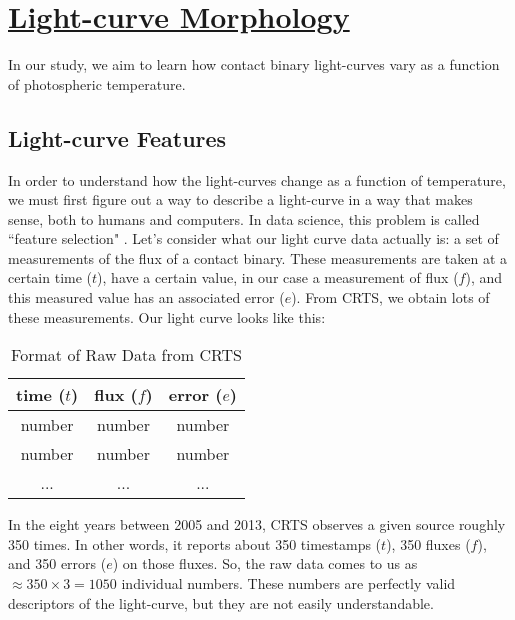 \documentclass[12pt]{article} %
\numberwithin{equation}{section} %
\begin{document}
\section[Light-curve Morphology]{\hyperlink{toc}{Light-curve Morphology}} \label{sec: lc_morph}

In our study, we aim to learn how contact binary light-curves vary as a function of photospheric temperature.

\subsection[Light-curve Features]{Light-curve Features} \label{sec: Light-curve Features}

In order to understand how the light-curves change as a function of temperature, we must first figure out a way to describe a light-curve in a way that makes sense, both to humans and computers. In data science, this problem is called ``feature selection" . Let's consider what our light curve data actually is: a set of measurements of the flux of a contact binary. These measurements are taken at a certain time ($t$), have a certain value, in our case a measurement of flux ($f$), and this measured value has an associated error ($e$). From CRTS, we obtain lots of these measurements. Our light curve looks like this:

\begin{table}[htdp]
\caption{Format of Raw Data from CRTS}
\begin{center}
\begin{tabular}{|c|c|c|} \hline
\textbf{time} ($t$) & \textbf{flux} ($f$) & \textbf{error} ($e$) \\ \hline
number & number & number \\ \hline
number & number & number \\ \hline
... & ... & ... \\
\end{tabular}
\end{center}
\label{default}
\end{table}%

In the eight years between 2005 and 2013, CRTS observes a given source roughly 350 times. In other words, it reports about 350 timestamps ($t$), 350 fluxes ($f$), and 350 errors ($e$) on those fluxes. So, the raw data comes to us as $\approx 350 \times 3 = 1050$ individual numbers. These numbers are perfectly valid descriptors of the light-curve, but they are not easily understandable.  
\end{document}
